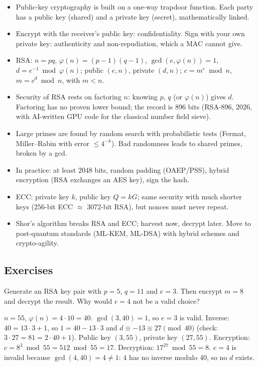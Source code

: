 \begin{summary}
\begin{itemize}
    \item Public-key cryptography is built on a one-way trapdoor function. Each party has a public key (shared) and a private key (secret), mathematically linked.
    \item Encrypt with the receiver's public key: confidentiality. Sign with your own private key: authenticity and non-repudiation, which a MAC cannot give.
    \item RSA: $n = pq$, $\varphi(n) = (p-1)(q-1)$, $\gcd(e,\varphi(n))=1$, $d = e^{-1} \bmod \varphi(n)$; public $(e,n)$, private $(d,n)$; $c = m^e \bmod n$, $m = c^d \bmod n$, with $m < n$.
    \item Security of RSA rests on factoring $n$: knowing $p$, $q$ (or $\varphi(n)$) gives $d$. Factoring has no proven lower bound; the record is 896 bits (RSA-896, 2026, with AI-written GPU code for the classical number field sieve).
    \item Large primes are found by random search with probabilistic tests (Fermat, Miller--Rabin with error $\le 4^{-k}$). Bad randomness leads to shared primes, broken by a gcd.
    \item In practice: at least 2048 bits, random padding (OAEP/PSS), hybrid encryption (RSA exchanges an AES key), sign the hash.
    \item ECC: private key $k$, public key $Q = kG$; same security with much shorter keys (256-bit ECC $\approx$ 3072-bit RSA), but nonces must never repeat.
    \item Shor's algorithm breaks RSA and ECC; harvest now, decrypt later. Move to post-quantum standards (ML-KEM, ML-DSA) with hybrid schemes and crypto-agility.
\end{itemize}
\end{summary}

\subsection*{Exercises}

\begin{exercise}
Generate an RSA key pair with $p = 5$, $q = 11$ and $e = 3$. Then encrypt $m = 8$ and decrypt the result. Why would $e = 4$ not be a valid choice?
\end{exercise}
\begin{solution}
$n = 55$, $\varphi(n) = 4 \cdot 10 = 40$. $\gcd(3, 40) = 1$, so $e = 3$ is valid. Inverse: $40 = 13 \cdot 3 + 1$, so $1 = 40 - 13 \cdot 3$ and $d \equiv -13 \equiv 27 \pmod{40}$ (check: $3 \cdot 27 = 81 = 2 \cdot 40 + 1$). Public key $(3, 55)$, private key $(27, 55)$.
Encryption: $c = 8^3 \bmod 55 = 512 \bmod 55 = 17$. Decryption: $17^{27} \bmod 55 = 8$.
$e = 4$ is invalid because $\gcd(4, 40) = 4 \neq 1$: $4$ has no inverse modulo 40, so no $d$ exists.
\end{solution}

